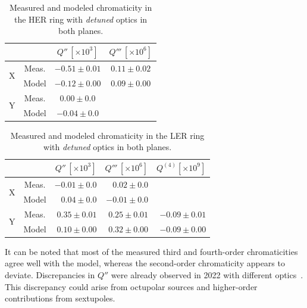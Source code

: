 \begin{table}[!htb]
    \centering
    \begin{tabular}{cccc}
        \toprule
            & & \(Q'' \, [\times 10^3]\) & \(Q''' \, [\times 10^6]\) \\ 
        \midrule
        \multirow{2}{*}{X} & Meas. & $-0.51 \pm 0.01$ & $0.11 \pm 0.02$ \\
                        & Model & $-0.12 \pm 0.00$ & $0.09 \pm 0.00$ \\
        \midrule
        \multirow{2}{*}{Y} & Meas. & $0.00 \pm 0.0$ & \\
                        & Model & $-0.04 \pm 0.0$ & \\
        \bottomrule
    \end{tabular}
    \caption{Measured and modeled chromaticity in the HER ring with \textit{detuned} optics in both
    planes.}
    \label{tab:kek:her_chroma_detuned}
\end{table}

\begin{table}[!htb]
    \centering
    \begin{tabular}{ccrrr}
        \toprule
            & & \(Q'' \, [\times 10^3]\) & \(Q''' \, [\times 10^6]\) & $Q^{(4)} [\times 10^9]$\\ 
        \midrule
        \multirow{2}{*}{X} & Meas. & $-0.01 \pm 0.0$ & $ 0.02 \pm 0.0$ \\
                        & Model & $ 0.04 \pm 0.0$ & $-0.01 \pm 0.0$ \\
        \midrule
        \multirow{2}{*}{Y} & Meas. & $0.35 \pm 0.01$ & $0.25 \pm 0.01$ & $-0.09 \pm 0.01$\\
                        & Model & $0.10 \pm 0.00$ & $0.32 \pm 0.00$ & $-0.09 \pm 0.00$ \\
        \bottomrule
    \end{tabular}
    \caption{Measured and modeled chromaticity in the LER ring with \textit{detuned} optics in both
    planes.}
    \label{tab:kek:ler_chroma_detuned}
\end{table}

It can be noted that most of the measured third and fourth-order chromaticities agree well with the
model, whereas the second-order chromaticity appears to deviate. Discrepancies in $Q''$ were
already observed in 2022 with different optics~\cite{keintzel_jacqueline_beam_2022}. This
discrepancy could arise from octupolar sources and higher-order contributions from sextupoles.



